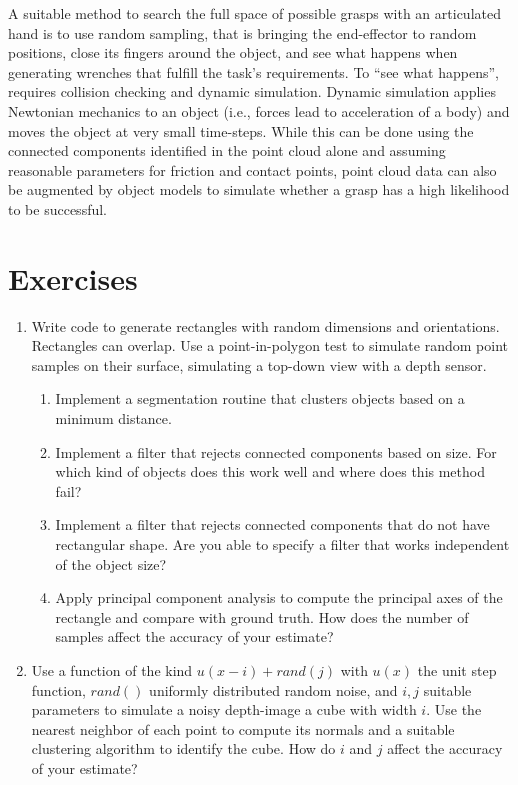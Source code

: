 A suitable method to search the full space of possible grasps with an articulated hand is to use random sampling, that is bringing the end-effector to random positions, close its fingers around the object, and see what happens when generating wrenches that fulfill the task's requirements.
To ``see what happens'', requires collision checking and dynamic simulation. Dynamic simulation applies Newtonian mechanics to an object (i.e., forces lead to acceleration of a body) and moves the object at very small time-steps. While this can be done using the connected components identified in the point cloud alone and assuming reasonable parameters for friction and contact points, point cloud data can also be augmented by object models to simulate whether a grasp has a high likelihood to be successful. 




\section{Exercises}
\begin{enumerate}
\item Write code to generate rectangles with random dimensions and orientations. Rectangles can overlap. Use a point-in-polygon test to simulate random point samples on their surface, simulating a top-down view with a depth sensor.
\begin{enumerate}
\item Implement a segmentation routine that clusters objects based on a minimum distance.
\item Implement a filter that rejects connected components based on size. For which kind of objects does this work well and where does this method fail?
\item Implement a filter that rejects connected components that do not have rectangular shape. Are you able to specify a filter that works independent of the object size?
\item Apply principal component analysis to compute the principal axes of the rectangle and compare with ground truth. How does the number of samples affect the accuracy of your estimate?
\end{enumerate}
\item Use a function of the kind $u(x-i)+rand(j)$ with $u(x)$ the unit step function, $rand()$ uniformly distributed random noise, and $i,j$ suitable parameters to simulate a noisy depth-image a cube with width $i$. Use the nearest neighbor of each point to compute its normals and a suitable clustering algorithm to identify the cube. How do $i$ and $j$ affect the accuracy of your estimate?
\end{enumerate}
